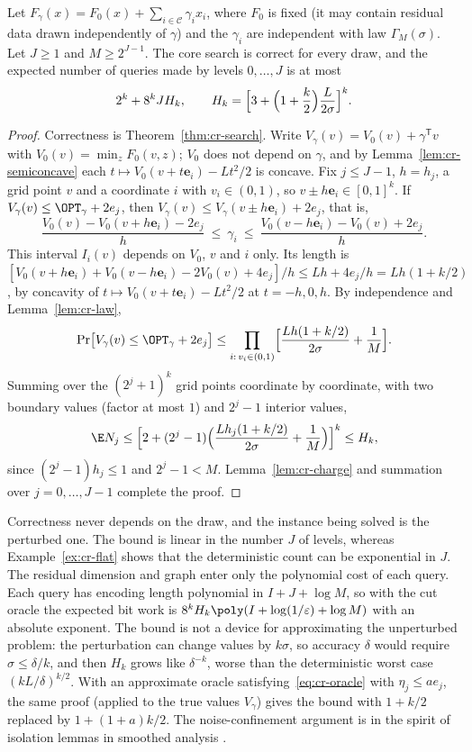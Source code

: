 \begin{theorem}\label{thm:cr-smoothed}
Let $F_\gamma(x)=F_0(x)+\sum_{i\in\mathcal C}\gamma_ix_i$, where $F_0$ is
fixed (it may contain residual data drawn independently of $\gamma$)
and the $\gamma_i$ are independent with law $\Gamma_M(\sigma)$. Let $J\ge1$
and $M\ge2^{J-1}$. The core search is correct for every draw, and the
expected number of queries made by levels $0,\ldots,J$ is at most
\[
2^k+8^kJH_k,\qquad
H_k=\Bigl[3+\Bigl(1+\frac k2\Bigr)\frac L{2\sigma}\Bigr]^k .
\]
\end{theorem}
\begin{proof}
Correctness is Theorem~\ref{thm:cr-search}. Write
$V_\gamma(v)=V_0(v)+\gamma^{\mathsf T}v$ with
$V_0(v)=\min_zF_0(v,z)$; $V_0$ does not depend on $\gamma$, and by
Lemma~\ref{lem:cr-semiconcave} each $t\mapsto V_0(v+t\mathbf e_i)-Lt^2/2$ is
concave. Fix $j\le J-1$, $h=h_j$, a grid point $v$ and a coordinate $i$
with $v_i\in(0,1)$, so $v\pm h\mathbf e_i\in[0,1]^k$. If
$V_\gamma(v)\le\OPT_\gamma+2e_j$, then
$V_\gamma(v)\le V_\gamma(v\pm h\mathbf e_i)+2e_j$, that is,
\[
\frac{V_0(v)-V_0(v+h\mathbf e_i)-2e_j}{h}\ \le\ \gamma_i\ \le\
\frac{V_0(v-h\mathbf e_i)-V_0(v)+2e_j}{h}.
\]
This interval $I_i(v)$ depends on $V_0$, $v$ and $i$ only. Its length is
$[V_0(v+h\mathbf e_i)+V_0(v-h\mathbf e_i)-2V_0(v)+4e_j]/h\le Lh+4e_j/h
=Lh(1+k/2)$, by concavity of $t\mapsto V_0(v+t\mathbf e_i)-Lt^2/2$ at
$t=-h,0,h$. By independence and Lemma~\ref{lem:cr-law},
\[
\Pr\bigl[V_\gamma(v)\le\OPT_\gamma+2e_j\bigr]\le
\prod_{i:\,v_i\in(0,1)}\Bigl[\frac{Lh(1+k/2)}{2\sigma}+\frac1M\Bigr].
\]
Summing over the $(2^j+1)^k$ grid points coordinate by coordinate, with
two boundary values (factor at most $1$) and $2^j-1$ interior values,
\[
\E N_j\le\Bigl[2+(2^j-1)\Bigl(\frac{Lh_j(1+k/2)}{2\sigma}+\frac1M\Bigr)\Bigr]^k
\le H_k ,
\]
since $(2^j-1)h_j\le1$ and $2^j-1<M$. Lemma~\ref{lem:cr-charge} and
summation over $j=0,\ldots,J-1$ complete the proof.
\end{proof}

\begin{remark}\label{rem:cr-smoothed}
Correctness never depends on the draw, and the instance being solved is
the perturbed one. The bound is linear in the number $J$ of levels,
whereas Example~\ref{ex:cr-flat} shows that the deterministic count can be
exponential in $J$. The residual dimension and graph enter only the
polynomial cost of each query. Each query has encoding length polynomial
in $I+J+\log M$, so with the cut oracle the expected bit work is
$8^kH_k\poly(I+\log(1/\varepsilon)+\log M)$ with an absolute exponent.
The bound is not a device for approximating the unperturbed problem: the
perturbation can change values by $k\sigma$, so accuracy $\delta$ would
require $\sigma\le\delta/k$, and then $H_k$ grows like $\delta^{-k}$,
worse than the deterministic worst case $(kL/\delta)^{k/2}$. With an
approximate oracle satisfying~\eqref{eq:cr-oracle} with $\eta_j\le ae_j$,
the same proof (applied to the true values $V_\gamma$) gives the bound
with $1+k/2$ replaced by $1+(1+a)k/2$. The noise-confinement argument is
in the spirit of isolation lemmas in smoothed analysis
\cite{BeierVocking2004,RoglinVocking2007}.
\end{remark}

